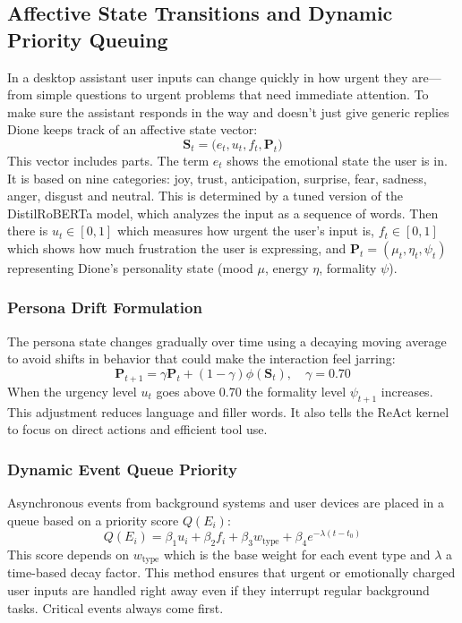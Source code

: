 \documentclass[conference,a4paper]{IEEEtran}
\begin{document}
\subsection{Affective State Transitions and Dynamic Priority Queuing}
In a desktop assistant user inputs can change quickly in how urgent they are---from simple questions to urgent problems that need immediate attention. To make sure the assistant responds in the way and doesn’t just give generic replies Dione keeps track of an affective state vector:
\begin{equation}
\mathbf{S}_t = \big(e_t, u_t, f_t, \mathbf{P}_t\big)
\end{equation}
This vector includes parts. The term $e_t$ shows the emotional state the user is in. It is based on nine categories: joy, trust, anticipation, surprise, fear, sadness, anger, disgust and neutral. This is determined by a tuned version of the DistilRoBERTa model, which analyzes the input as a sequence of words. Then there is $u_t \in [0, 1]$ which measures how urgent the user’s input is, $f_t \in [0, 1]$ which shows how much frustration the user is expressing, and $\mathbf{P}_t = (\mu_t, \eta_t, \psi_t)$ representing Dione’s personality state (mood $\mu$, energy $\eta$, formality $\psi$).

\subsubsection{Persona Drift Formulation}
The persona state changes gradually over time using a decaying moving average to avoid shifts in behavior that could make the interaction feel jarring:
\begin{equation}
\mathbf{P}_{t+1} = \gamma \mathbf{P}_t + (1 - \gamma) \phi(\mathbf{S}_t), \quad \gamma = 0.70
\end{equation}
When the urgency level $u_t$ goes above 0.70 the formality level $\psi_{t+1}$ increases. This adjustment reduces language and filler words. It also tells the ReAct kernel to focus on direct actions and efficient tool use.

\subsubsection{Dynamic Event Queue Priority}
Asynchronous events from background systems and user devices are placed in a queue based on a priority score $Q(E_i)$:
\begin{equation}
Q(E_i) = \beta_1 u_i + \beta_2 f_i + \beta_3 w_{\text{type}} + \beta_4 e^{-\lambda (t - t_0)}
\end{equation}
This score depends on $w_{\text{type}}$ which is the base weight for each event type and $\lambda$ a time-based decay factor. This method ensures that urgent or emotionally charged user inputs are handled right away even if they interrupt regular background tasks. Critical events always come first.
\end{document}
